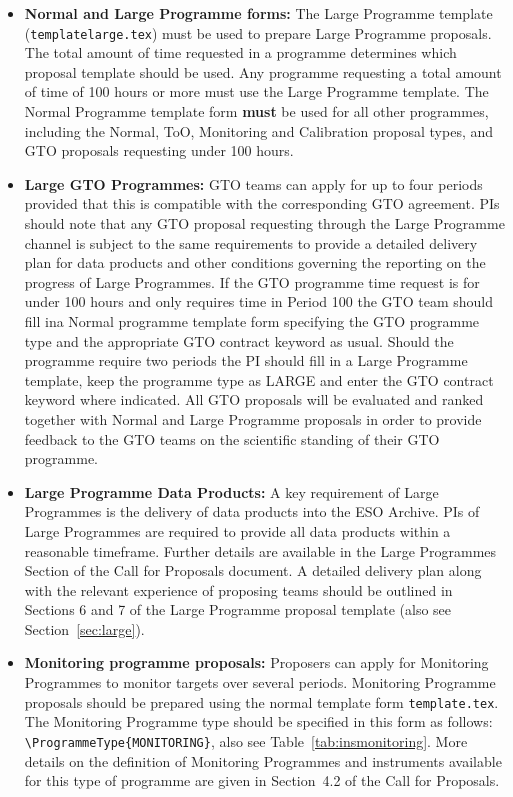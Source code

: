 \documentclass{article}
\begin{document}
\begin{itemize}

\item{\bf Normal and Large Programme forms:}
The Large Programme template ({\tt templatelarge.tex}) must be used to
prepare Large Programme proposals. The total amount of time requested in a programme determines which proposal template should be used.
Any programme requesting a total amount of time of 100 hours or more
must use the Large Programme template.
The Normal Programme template form {\bf must} be used for all other programmes,
including the Normal, ToO, Monitoring and Calibration proposal types, and GTO proposals
requesting under 100 hours.

\item{\bf Large GTO Programmes:} 
GTO teams can apply for up to four periods provided that this is compatible with the corresponding GTO agreement.
PIs should note that any GTO proposal requesting through the Large Programme channel is subject to the same requirements to provide a detailed delivery plan for data products and other conditions governing the reporting on the progress of Large Programmes.
If the GTO programme time request is for under 100 hours and only requires time in Period 100 the GTO team should fill ina Normal programme template form specifying the GTO programme type and the appropriate GTO contract keyword as usual. 
Should the programme require two periods the PI should fill in a Large Programme template,
keep the programme type as LARGE and enter the GTO contract keyword where indicated.
All GTO proposals will be evaluated and ranked together with Normal and Large Programme proposals in order to provide feedback to the GTO teams on the scientific standing of their GTO programme.


\item{\bf Large Programme Data Products: }
A key requirement of Large Programmes is the delivery of data products into the ESO Archive. PIs of Large Programmes are required to provide all data products within a reasonable timeframe. Further details are available in the Large Programmes Section of the Call for Proposals document.
A detailed delivery plan along with the relevant experience of proposing teams
should be outlined in Sections 6 and 7 of the Large Programme proposal template
(also see Section~\ref{sec:large}).

\item{\bf Monitoring programme proposals:}  
Proposers can apply for Monitoring Programmes to monitor targets over several periods.  
Monitoring Programme proposals should be prepared using the normal template form \verb|template.tex|. 
The Monitoring Programme type should be specified in this form as follows: \verb|\ProgrammeType{MONITORING}|, also see Table~\ref{tab:insmonitoring}.
More details on the definition of Monitoring Programmes and instruments available for this type of programme are given in Section~4.2 of the Call for Proposals.


\end{itemize}
\end{document}
